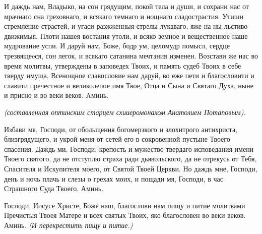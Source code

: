  


И даждь нам, Владыко, на сон грядущим, покой тела и души, и сохрани нас от мрачнаго сна греховнаго, и всякаго темнаго и нощнаго сладострастия. Утиши стремление страстей, и угаси разжженныя стрелы лукаваго, яже на ны льстиво движимыя. Плоти нашея востания утоли, и всяко земное и вещественное наше мудрование успи. И даруй нам, Боже, бодр ум, целомудр помысл, сердце трезвящеeся, сон легок, и всякаго сатанина мечтания изменен. Возстави же нас во время молитвы, утверждены в заповедех Твоих, и память судеб Твоих в себе тверду имуща. Всенощное славословие нам даруй, во еже пети и благословити и славити пречестное и великолепое имя Твое, Отца и Сына и Святаго Духа, ныне и присно и во веки веков. Aминь.



\mychapterending

 



\itshape (составленная оптинским старцем схииеромонахом Анатолием Потаповым).\normalfont{}



Избави мя, Господи, от обольщения богомерзкого и злохитрого антихриста, близгрядущего, и укрой меня от сетей его в сокровенной пустыне Твоего спасения. Даждь ми, Господи, крепость и мужество твердаго исповедания имени Твоего святого, да не отступлю страха ради дьявольского, да не отрекусь от Тебя, Спасителя и Искупителя моего, от Святой Твоей Церкви. Но даждь мне, Господи, день и ночь плачь и слезы о грехах моих, и пощади мя, Господи, в час Страшного Суда Твоего. Аминь.


\itshape \normalfont{}


 
\mychapterending

 



Господи, Иисусе Христе, Боже наш, благослови нам пищу и питие молитвами Пречистыя Твоея Матере и всех святых Твоих, яко благословен во веки веков. Аминь. \itshape (И перекрестить пищу и питие.)\normalfont{}




\mychapterending

 


